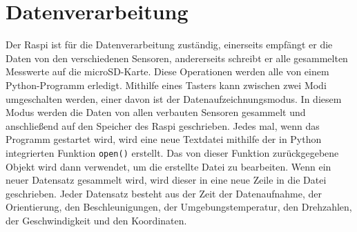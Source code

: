 \section{Datenverarbeitung}
\label{sec:Datenverarbeitung}
Der \ac{Raspi} ist für die Datenverarbeitung zuständig, einerseits empfängt er die Daten von den verschiedenen Sensoren, andererseits schreibt er alle gesammelten Messwerte auf die microSD-Karte. Diese Operationen werden alle von einem Python-Programm erledigt. Mithilfe eines Tasters kann zwischen zwei Modi umgeschalten werden, einer davon ist der Datenaufzeichnungsmodus. In diesem Modus werden die Daten von allen verbauten Sensoren gesammelt und anschließend auf den Speicher des \ac{Raspi} geschrieben. Jedes mal, wenn das Programm gestartet wird, wird eine neue Textdatei mithilfe der in Python integrierten Funktion \verb|open()| erstellt. Das von dieser Funktion zurückgegebene Objekt wird dann verwendet, um die erstellte Datei zu bearbeiten. Wenn ein neuer Datensatz gesammelt wird, wird dieser in eine neue Zeile in die Datei geschrieben. Jeder Datensatz besteht aus der Zeit der Datenaufnahme, der Orientierung, den Beschleunigungen, der Umgebungstemperatur, den Drehzahlen, der Geschwindigkeit und den Koordinaten.